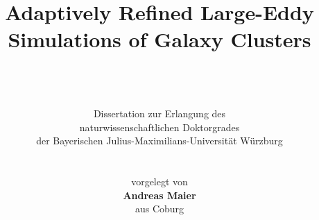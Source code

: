 \title{\Huge{Adaptively Refined Large-Eddy Simulations of Galaxy Clusters}}
\author{
\\
\\
\\
Dissertation zur Erlangung des \\ 
naturwissenschaftlichen Doktorgrades \\ 
der Bayerischen Julius-Maximilians-Universität Würzburg\\ 
\\
\\
vorgelegt von \\ 
\textbf{Andreas Maier} \\ 
aus Coburg\\
\\
\\
\\
\\
\\
\\
\\
}
\date{}
\publishers{Würzburg 2008}
\uppertitleback{
\vspace{5cm}
Eingereicht am\\
bei der Fakultät für Physik und Astronomie
\\
\\
\\
1. Gutachter: Prof. Dr. Jens Niemeyer\\
2. Gutachter:\\
der Dissertation\\
\\
\\
\\
1. Prüfer: Prof. Dr. Jens Niemeyer\\
2. Prüfer:\\
3. Prüfer:\\
im Promotionskolloquium\\
\\
\\
\\
Tag des Promotionskolloquiums:\\
\\
\\
Doktorurkunde ausgehändigt am \ \underline{\hspace{3cm}}
}
 
\dedication{\foreignlanguage{russian}{Posvyashchayu Olp1ge}}

